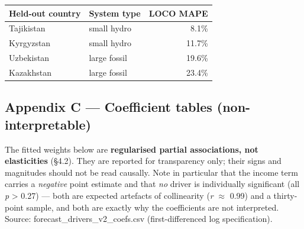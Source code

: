\documentclass[10pt,twocolumn]{article}
\begin{document}
\begin{table}[tbp]
\centering
\renewcommand{\arraystretch}{1.18}\small
\begin{tabular}{llr}
\toprule
\textbf{Held-out country} & \textbf{System type} & \textbf{LOCO MAPE} \\
\midrule
Tajikistan & small hydro & 8.1\% \\
Kyrgyzstan & small hydro & 11.7\% \\
Uzbekistan & large fossil & 19.6\% \\
Kazakhstan & large fossil & 23.4\% \\
\bottomrule
\end{tabular}
\par{}
\end{table}

\subsection*{Appendix C --- Coefficient tables (non-interpretable)}

The fitted weights below are \textbf{regularised partial associations, not elasticities} (\S{}4.2). They are reported for transparency only; their signs and magnitudes should not be read causally. Note in particular that the income term carries a \textit{negative} point estimate and that \textit{no} driver is individually significant (all \textit{p} \textgreater{} 0.27) --- both are expected artefacts of collinearity (\textit{r} $\approx$ 0.99) and a thirty-point sample, and both are exactly why the coefficients are not interpreted. Source: forecast\_drivers\_v2\_coefs.csv (first-differenced log specification).
\end{document}
